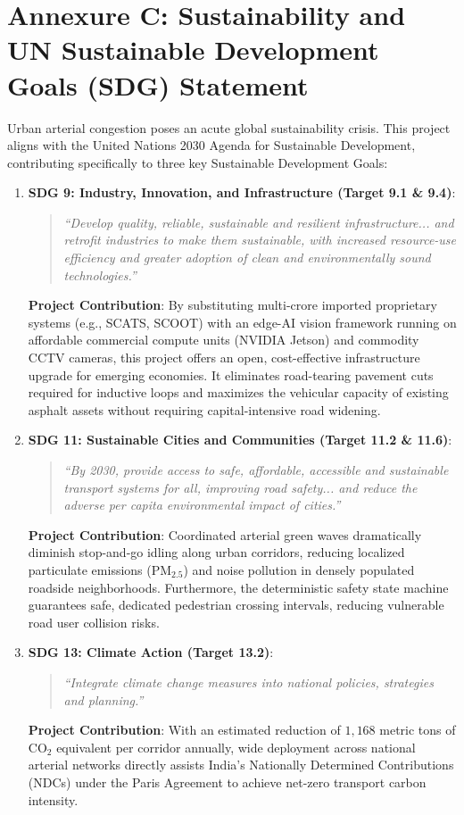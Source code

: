 \chapter*{Annexure C: Sustainability and UN Sustainable Development Goals (SDG) Statement}
\label{annex:sustainability}

Urban arterial congestion poses an acute global sustainability crisis. This project aligns with the United Nations 2030 Agenda for Sustainable Development, contributing specifically to three key Sustainable Development Goals:

\begin{enumerate}
    \item \textbf{SDG 9: Industry, Innovation, and Infrastructure (Target 9.1 \& 9.4)}:
    \begin{quote}
        \textit{``Develop quality, reliable, sustainable and resilient infrastructure... and retrofit industries to make them sustainable, with increased resource-use efficiency and greater adoption of clean and environmentally sound technologies.''}
    \end{quote}
    \textbf{Project Contribution}: By substituting multi-crore imported proprietary systems (e.g., SCATS, SCOOT) with an edge-AI vision framework running on affordable commercial compute units (NVIDIA Jetson) and commodity CCTV cameras, this project offers an open, cost-effective infrastructure upgrade for emerging economies. It eliminates road-tearing pavement cuts required for inductive loops and maximizes the vehicular capacity of existing asphalt assets without requiring capital-intensive road widening.

    \item \textbf{SDG 11: Sustainable Cities and Communities (Target 11.2 \& 11.6)}:
    \begin{quote}
        \textit{``By 2030, provide access to safe, affordable, accessible and sustainable transport systems for all, improving road safety... and reduce the adverse per capita environmental impact of cities.''}
    \end{quote}
    \textbf{Project Contribution}: Coordinated arterial green waves dramatically diminish stop-and-go idling along urban corridors, reducing localized particulate emissions ($\text{PM}_{2.5}$) and noise pollution in densely populated roadside neighborhoods. Furthermore, the deterministic safety state machine guarantees safe, dedicated pedestrian crossing intervals, reducing vulnerable road user collision risks.

    \item \textbf{SDG 13: Climate Action (Target 13.2)}:
    \begin{quote}
        \textit{``Integrate climate change measures into national policies, strategies and planning.''}
    \end{quote}
    \textbf{Project Contribution}: With an estimated reduction of $1,168$ metric tons of $\text{CO}_2$ equivalent per corridor annually, wide deployment across national arterial networks directly assists India's Nationally Determined Contributions (NDCs) under the Paris Agreement to achieve net-zero transport carbon intensity.
\end{enumerate}
